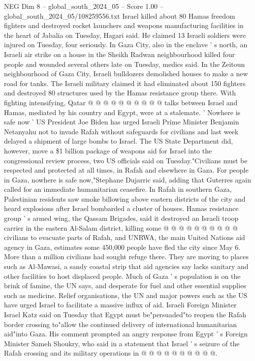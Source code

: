 \begin{textsample}{NEG Dim 8 – global\_south\_2024\_05 – Score 1.00 – global\_south\_2024\_05/108259556.txt}
Israel killed about 80 Hamas freedom fighters and destroyed rocket launchers and weapons manufacturing facilities in the heart of Jabalia on Tuesday, Hagari said.
He claimed 13 Israeli soldiers were injured on Tuesday, four seriously.
In Gaza City, also in the enclave ' s north, an Israeli air strike on a house in the Sheikh Radwan neighbourhood killed four people and wounded several others late on Tuesday, medics said.
In the Zeitoun neighbourhood of Gaza City, Israeli bulldozers demolished houses to make a new road for tanks.
The Israeli military claimed it had eliminated about 150 fighters and destroyed 80 structures used by the Hamas resistance group there.
With fighting intensifying, Qatar @ @ @ @ @ @ @ @ @ @ talks between Israel and Hamas, mediated by his country and Egypt, were at a stalemate. ' Nowhere is safe now ' US President Joe Biden has urged Israeli Prime Minister Benjamin Netanyahu not to invade Rafah without safeguards for civilians and last week delayed a shipment of large bombs to Israel.
The US State Department did, however, move a \$1 billion package of weapons aid for Israel into the congressional review process, two US officials said on Tuesday."Civilians must be respected and protected at all times, in Rafah and elsewhere in Gaza.
For people in Gaza, nowhere is safe now,"Stephane Dujarric said, adding that Guterres again called for an immediate humanitarian ceasefire.
In Rafah in southern Gaza, Palestinian residents saw smoke billowing above eastern districts of the city and heard explosions after Israel bombarded a cluster of houses.
Hamas resistance group ' s armed wing, the Qassam Brigades, said it destroyed an Israeli troop carrier in the eastern Al-Salam district, killing some @ @ @ @ @ @ @ @ @ @ civilians to evacuate parts of Rafah, and UNRWA, the main United Nations aid agency in Gaza, estimates some 450,000 people have fled the city since May 6.
More than a million civilians had sought refuge there.
They are moving to places such as Al-Mawasi, a sandy coastal strip that aid agencies say lacks sanitary and other facilities to host displaced people.
Much of Gaza ' s population is on the brink of famine, the UN says, and desperate for fuel and other essential supplies such as medicine.
Relief organisations, the UN and major powers such as the US have urged Israel to facilitate a massive influx of aid.
Israeli Foreign Minister Israel Katz said on Tuesday that Egypt must be"persuaded"to reopen the Rafah border crossing to"allow the continued delivery of international humanitarian aid"into Gaza.
His comment prompted an angry response from Egypt ' s Foreign Minister Sameh Shoukry, who said in a statement that Israel ' s seizure of the Rafah crossing and its military operations in @ @ @ @ @ @ @ @ @ @.

\end{textsample}
